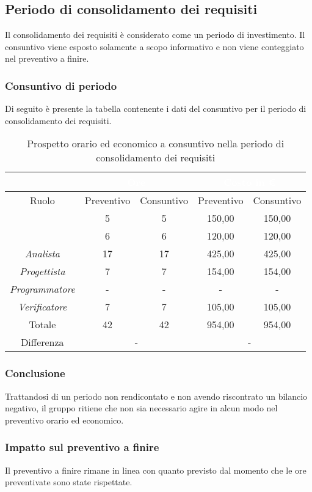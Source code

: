 \subsection{Periodo di consolidamento dei requisiti}
Il consolidamento dei requisiti è considerato come un periodo di investimento. Il consuntivo viene esposto solamente a scopo informativo e non viene conteggiato nel preventivo a finire.
\subsubsection{Consuntivo di periodo}
Di seguito è presente la tabella contenente i dati del consuntivo per il periodo di consolidamento dei requisiti.
\begin{table}[H]
	\centering
	\begin{tabular}{|c|c|c|c|c|}
		\rowcolor{darkblue} 
		&\multicolumn{2}{c|}{\textcolor{white}{Ore}}&\multicolumn{2}{c|}{\textcolor{white}{Costo in €}}\\ \hline
		Ruolo			&	Preventivo				&	Consuntivo		&	Preventivo	&	Consuntivo\\ \hline
		{\Responsabile}		&	5					&	5				&	150,00		&	150,00 \\ \hline
		{\Amministratore}	&	6					&	6				&	120,00		&	120,00 \\ \hline
		\textit{Analista}	&	17					&	17				&	425,00		&	425,00 \\ \hline
		\textit{Progettista}& 	7					&	7 				& 	154,00		&  	154,00 \\ \hline
		\textit{Programmatore}& -					& 	-				& 	-			&  	- \\ \hline
		\textit{Verificatore}&	7					&	7				&	105,00		&	105,00 \\ \hline
		Totale				&	42					&	42				&	954,00		&	954,00 \\ \hline
		Differenza			& 	\multicolumn{2}{c|}{-} 			&\multicolumn{2}{c|}{-}\\ \hline
	\end{tabular}
	\caption{Prospetto orario ed economico a consuntivo nella periodo di consolidamento dei requisiti}
\end{table}
\subsubsection{Conclusione}
Trattandosi di un periodo non rendicontato e non avendo riscontrato un bilancio negativo, il gruppo {\Gruppo} ritiene che non sia necessario agire in alcun modo nel preventivo orario ed economico.
\subsubsection{Impatto sul preventivo a finire}
Il preventivo a finire rimane in linea con quanto previsto dal momento che le ore preventivate sono state rispettate.